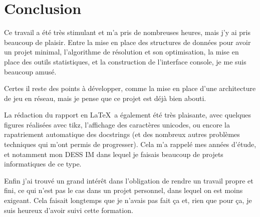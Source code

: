 \chapter{Conclusion}
Ce travail a été très stimulant et m'a pris de nombreuses heures, mais j'y ai pris beaucoup de plaisir. Entre la mise en place des structures de données pour avoir un projet minimal, l'algorithme de résolution et son optimisation, la mise en place des outils statistiques, et la construction de l'interface console, je me suis beaucoup amusé.

Certes il reste des points à développer, comme la mise en place d'une architecture de jeu en réseau, mais je pense que ce projet est déjà bien abouti. 

La rédaction du rapport en \LaTeX\ a également été très plaisante, avec quelques figures réalisées avec tikz, l'affichage des caractères unicodes, ou encore la rapatriement automatique des docstrings (et des nombreux autres problèmes techniques qui m'ont permis de progresser). Cela m'a rappelé mes années d'étude, et notamment mon DESS IM dans lequel je faisais beaucoup de projets informatiques de ce type.

Enfin j'ai trouvé un grand intérêt dans l'obligation de rendre un travail propre et fini, ce qui n'est pas le cas dans un projet personnel, dans lequel on est moins exigeant. Cela faisait longtemps que je n'avais pas fait ça et, rien que pour ça, je suis heureux d'avoir suivi cette formation.
